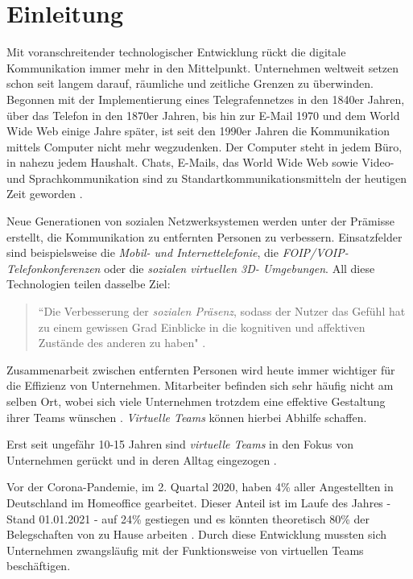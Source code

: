 \documentclass[a4paper,11pt]{article}%
\renewcommand{\\}{\vspace*{0.5\baselineskip} \newline}
\begin{document}
\section*{Einleitung}
	Mit voranschreitender technologischer Entwicklung rückt die digitale Kommunikation immer mehr in den Mittelpunkt. Unternehmen weltweit setzen schon seit langem darauf, räumliche und zeitliche Grenzen zu überwinden. Begonnen mit der Implementierung eines Telegrafennetzes in den 1840er Jahren, über das Telefon in den 1870er Jahren, bis hin zur E-Mail 1970 und dem World Wide Web einige Jahre später, ist seit den 1990er Jahren die Kommunikation mittels Computer nicht mehr wegzudenken. Der Computer steht in jedem Büro, in nahezu jedem Haushalt. Chats, E-Mails, das World Wide Web sowie Video- und Sprachkommunikation sind zu Standartkommunikationsmitteln der heutigen Zeit geworden \citep[p. 14-16]{thurlow2004computer}.
	
Neue Generationen von sozialen Netzwerksystemen werden unter der Prämisse erstellt, die Kommunikation zu entfernten Personen zu verbessern.
Einsatzfelder sind beispielsweise die \textit{Mobil- und Internettelefonie}, die\textit{ FOIP/VOIP-Telefonkonferenzen} oder die \textit{sozialen virtuellen 3D- Umgebungen}.
All diese Technologien teilen dasselbe Ziel: 
\begin{quote}
``Die Verbesserung der \textit{sozialen Präsenz}, sodass der Nutzer das Gefühl hat zu einem gewissen Grad Einblicke in die kognitiven und affektiven Zustände des anderen zu haben" \citep{biocca2002defining} \citep[S. 407–447]{biocca2001plugging}.
\end{quote}

Zusammenarbeit zwischen entfernten Personen wird heute immer wichtiger für die Effizienz von Unternehmen. Mitarbeiter befinden sich sehr häufig nicht am selben Ort, wobei sich viele Unternehmen trotzdem eine effektive Gestaltung ihrer Teams wünschen \citep[S. 791-792]{jarvenpaa1999communication}. \textit{Virtuelle Teams} können hierbei Abhilfe schaffen. 
	
Erst seit ungefähr 10-15 Jahren sind \textit{virtuelle Teams} in den Fokus von Unternehmen gerückt und in deren Alltag eingezogen \citep{gilson2015virtual}.

Vor der Corona-Pandemie, im 2. Quartal 2020, haben 4\% aller Angestellten in Deutschland im Homeoffice gearbeitet. Dieser Anteil ist im Laufe des Jahres - Stand 01.01.2021 - auf 24\% gestiegen und es könnten theoretisch 80\% der Belegschaften von zu Hause arbeiten \citep{statistaCorona2020}. Durch diese Entwicklung mussten sich Unternehmen zwangsläufig mit der Funktionsweise von virtuellen Teams beschäftigen.
\end{document}
